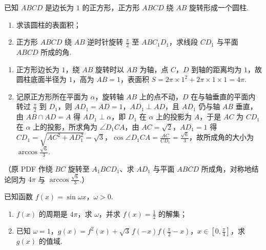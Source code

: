 \begin{problem}
已知 \(ABCD\) 是边长为 \(1\) 的正方形，正方形 \(ABCD\) 绕 \(AB\) 旋转形成一个圆柱.

\begin{enumerate}
\item 求该圆柱的表面积；
\item 正方形 \(ABCD\) 绕 \(AB\) 逆时针旋转 \(\frac{\pi}{2}\) 至 \(ABC_1D_1\)，求线段 \(CD_1\) 与平面 \(ABCD\) 所成的角.
\end{enumerate}

\end{problem}

\begin{solution}
\begin{enumerate}
\item 正方形边长为 \(1\)，绕 \(AB\) 旋转时以 \(AB\) 为轴，点 \(C\)，\(D\) 到轴的距离均为 \(1\)，故圆柱底面半径为 \(1\)，高为 \(AB=1\)，表面积 \(S=2\pi\times1^2+2\pi\times1\times1=4\pi\).
\item 记原正方形所在平面为 \(\alpha\)，旋转轴 \(AB\) 上的点不动，\(D\) 在与轴垂直的平面内转过 \(\frac{\pi}{2}\) 到 \(D_1\)，则 \(AD_1=AD=1\)，\(AD_1\perp AD\)，且 \(AD_1\) 仍与轴 \(AB\) 垂直，由 \(AB\cap AD=A\) 得 \(AD_1\perp\alpha\)，即 \(D_1\) 在 \(\alpha\) 上的投影为 \(A\)，于是 \(AC\) 为 \(CD_1\) 在 \(\alpha\) 上的投影，所求角为 \(\angle D_1CA\)，由 \(AC=\sqrt2\)，\(AD_1=1\) 得 \(CD_1=\sqrt{AC^2+AD_1^2}=\sqrt3\)，\(\cos\angle D_1CA=\frac{AC}{CD_1}=\frac{\sqrt6}{3}\)，故所成角的大小为 \(\arccos\frac{\sqrt6}{3}\).
\end{enumerate}（原 PDF 作绕 \(BC\) 旋转至 \(A_1BCD_1\)、求 \(AD_1\) 与平面 \(ABCD\) 所成角，对称地结论同为 \(4\pi\) 与 \(\arccos\frac{\sqrt6}{3}\).）
\end{solution}

\begin{problem}
已知函数 \(f(x)=\sin\omega x\)，\(\omega>0\).

\begin{enumerate}
\item \(f(x)\) 的周期是 \(4\pi\)，求 \(\omega\)，并求 \(f(x)=\frac12\) 的解集；
\item 已知 \(\omega=1\)，\(g(x)=f^2(x)+\sqrt3\,f(-x)f\!\left(\frac\pi2-x\right)\)，\(x\in\left[0,\frac\pi4\right]\)，求 \(g(x)\) 的值域.
\end{enumerate}
\end{problem}

